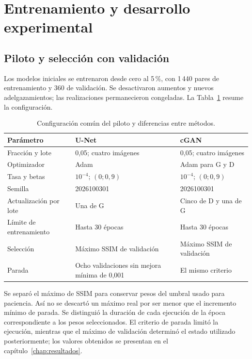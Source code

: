 \section{Entrenamiento y desarrollo experimental}\label{sec:met-entrenamiento}
\subsection{Piloto y selección con validación}
Los modelos iniciales se entrenaron desde cero al 5\,\%, con 1\,440 pares de entrenamiento y 360 de validación. Se desactivaron aumentos y nuevos adelgazamientos; las realizaciones permanecieron congeladas. La Tabla~\ref{tab:met-entrenamiento} resume la configuración.
\begin{table}[htbp]\centering\small
\caption{Configuración común del piloto y diferencias entre métodos.}\label{tab:met-entrenamiento}
\begin{tabularx}{\linewidth}{@{}p{3.8cm}XX@{}}\toprule
Parámetro & U-Net & cGAN\\\midrule
Fracción y lote & 0,05; cuatro imágenes & 0,05; cuatro imágenes\\
Optimizador & Adam & Adam para G y D\\
Tasa y betas & $10^{-4}$; $(0;0,9)$ & $10^{-4}$; $(0;0,9)$\\
Semilla & 2026100301 & 2026100301\\
Actualización por lote & Una de G & Cinco de D y una de G\\
Límite de entrenamiento & Hasta 30 épocas & Hasta 30 épocas\\
Selección & Máximo SSIM de validación & Máximo SSIM de validación\\
Parada & Ocho validaciones sin mejora mínima de 0,001 & El mismo criterio\\\bottomrule
\end{tabularx}\end{table}
Se separó el máximo de SSIM para conservar pesos del umbral usado para paciencia. Así no se descartó un máximo real por ser menor que el incremento mínimo de parada. Se distinguió la duración de cada ejecución de la época correspondiente a los pesos seleccionados. El criterio de parada limitó la ejecución, mientras que el máximo de validación determinó el estado utilizado posteriormente; los valores obtenidos se presentan en el capítulo~\ref{chap:resultados}.

